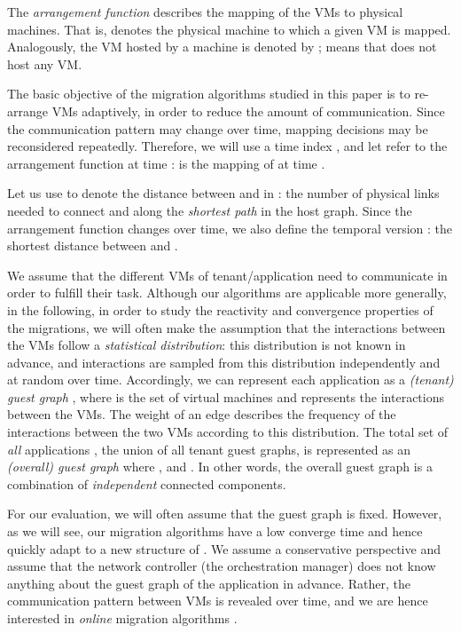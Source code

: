 \documentclass[conference]{IEEEtran}
\begin{document}
The \emph{arrangement function}  describes the mapping of the VMs to physical machines. That is,  denotes the physical machine to which a given VM  is mapped. Analogously, the VM hosted by a machine  is denoted by ;  means that  does not host any VM.

The basic objective of the migration algorithms studied in this paper is to re-arrange VMs adaptively, in order to reduce the amount of communication. Since the communication pattern may change over time, mapping decisions may be reconsidered repeatedly. Therefore, we will use a time index , and let  refer to the arrangement function at time :  is the mapping of  at time .

Let us use  to denote the distance between  and  in : the number of physical links  needed to connect  and  along the \emph{shortest path} in the host graph. Since the arrangement function changes over time, we also define the temporal version : the shortest distance between  and .

We assume that the different VMs of tenant/application  need to communicate in order to fulfill their task. Although our algorithms
are applicable more generally, in the following, in order to study the reactivity and convergence properties of the migrations,
we will often make the assumption that the interactions between the VMs follow a \emph{statistical distribution}:
this distribution is not known in advance, and interactions are sampled from this distribution independently and at random over time.
Accordingly, we can represent each application  as a \emph{(tenant) guest graph} ,
where  is the set of virtual machines and
 represents the interactions between the VMs. The weight  of an edge  describes the
frequency of the interactions between the two VMs  according to this distribution.
The total set of \emph{all} applications , the union of all tenant guest graphs, is represented as an \emph{(overall) guest graph} 
where ,  and .
In other words, the overall guest graph  is a combination of \emph{independent} connected components.

For our evaluation, we will often assume that the guest graph  is fixed. However, as we will see,
our migration algorithms have a low converge time and hence quickly adapt to a new structure of .
We assume a conservative perspective and assume that the network controller (the orchestration manager) does not know anything
about the guest graph  of the application in advance.
Rather, the communication pattern between VMs is revealed over time, and we are hence interested in \emph{online} migration algorithms .
\end{document}
